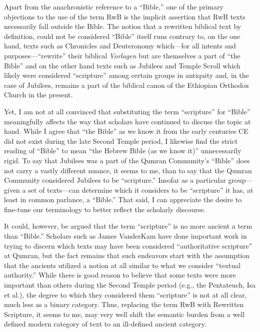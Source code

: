 Apart from the anachronistic reference to a ``Bible,'' one of the
primary objections to the use of the term RwB is the implicit assertion
that RwB texts necessarily fall outside the
Bible.\autocite[61]{campbell_zsengeller2014} The notion that a rewritten
biblical text by definition, could not be considered ``Bible'' itself
runs contrary to, on the one hand, texts such as Chronicles and
Deuteronomy which---for all intents and purposes---``rewrite'' their
biblical \emph{Vorlagen} but are themselves a part of ``the Bible'' and
on the other hand texts such as Jubilees and Temple Scroll which likely
were considered ``scripture'' among certain groups in antiquity and, in
the case of Jubilees, remains a part of the biblical canon of the
Ethiopian Orthodox Church in the present.

Yet, I am not at all convinced that substituting the term ``scripture''
for ``Bible'' meaningfully affects the way that scholars have continued
to discuss the topic at hand. While I agree that ``the Bible'' as we
know it from the early centuries CE did not exist during the late
Second Temple period, I likewise find the strict reading of ``Bible'' to
mean ``the Hebrew Bible (as we know it)'' unnecessarily rigid. To say
that Jubilees was a part of the Qumran Community's ``Bible'' does not
carry a vastly different nuance, it seems to me, than to say that the
Qumran Community considered Jubilees to be ``scripture.'' Insofar as a
particular group---given a set of texts---can determine which it
considers to be ``scripture'' it has, at least in common parlance, a
``Bible.'' That said, I can appreciate the desire to fine-tune our
terminology to better reflect the scholarly discourse.

It could, however, be argued that the term ``scripture'' is no more
ancient a term than ``Bible.'' Scholars such as James VanderKam have
done important work in trying to discern which texts may have been
considered ``authoritative scripture'' at Qumran, but the fact remains
that such endeavors start with the assumption that the ancients utilized
a notion at all similar to what we consider ``textual authority.'' While
there is good reason to believe that some texts were more important than
others during the Second Temple period (e.g., the Pentateuch, Isa et
al.), the degree to which they considered them ``scripture'' is not at
all clear, much less as a binary category. Thus, replacing the term RwB
with Rewritten Scripture, it seems to me, may very well shift the
semantic burden from a well defined modern category of text to an
ill-defined ancient category.

